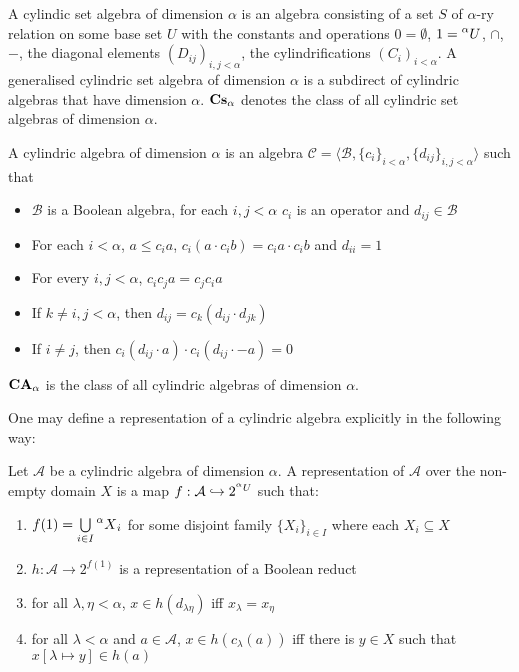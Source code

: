 \documentclass[a4paper]{article}
\theoremstyle{defin}
\theoremstyle{theorem}
\theoremstyle{claim}
\theoremstyle{prop}
\theoremstyle{lemma}
\theoremstyle{fact}
\theoremstyle{ex}
\theoremstyle{col}
\begin{document}
\begin{defin}
 A cylindic set algebra of dimension $\alpha$ is an algebra consisting of a set $S$ of $\alpha$-ry relation on some base set $U$
   with the constants and operations $0 = \emptyset$, $1 = \prescript{\alpha}{}U$, $\cap$, $-$, the diagonal elements $(D_{ij})_{i, j < \alpha}$, the cylindrifications $(C_i)_{i < \alpha}$. A generalised cylindric set algebra of dimension $\alpha$ is a subdirect of cylindric algebras that have dimension $\alpha$.
   ${\bf Cs}_{\alpha}$ denotes the class of all cylindric set algebras of dimension $\alpha$.
\end{defin}

\begin{defin}
   A cylindric algebra of dimension $\alpha$ is an algebra $\mathcal{C} = \langle \mathcal{B}, \{ c_i \}_{i < \alpha}, \{ d_{ij} \}_{i, j < \alpha} \rangle$ such that
   \begin{itemize}
     \item $\mathcal{B}$ is a Boolean algebra, for each $i, j < \alpha$ $c_i$ is an operator and $d_{ij} \in \mathcal{B}$
     \item For each $i < \alpha$, $a \leq c_i a$, $c_i (a \cdot c_i b) = c_i a \cdot c_i b$ and $d_{ii} = 1$
     \item For every $i, j < \alpha$, $c_i c_j a = c_j c_i a$
     \item If $k \neq i, j < \alpha$, then $d_{ij} = c_k (d_{ij} \cdot d_{jk})$
     \item If $i \neq j$, then $c_i (d_{ij} \cdot a) \cdot c_i (d_{ij} \cdot - a) = 0$
   \end{itemize}
   ${\bf CA}_{\alpha}$ is the class of all cylindric algebras of dimension $\alpha$.
\end{defin}

One may define a representation of a cylindric algebra explicitly in the following way:

\begin{defin}
 Let $\mathcal{A}$ be a cylindric algebra of dimension $\alpha$. A representation of $\mathcal{A}$ over the non-empty domain $X$ is a map $f : \mathcal{A} \hookrightarrow 2^{\prescript{\alpha}{}U}$ such that:
 \begin{enumerate}
   \item $f(1) = \bigcup \limits_{i \in I} \prescript{\alpha}{}X_i$ for some disjoint family $\{X_i\}_{i \in I}$ where each $X_i \subseteq X$
   \item $h : \mathcal{A} \to 2^{f(1)}$ is a representation of a Boolean reduct
   \item for all $\lambda, \eta < \alpha$, $x \in h(d_{\lambda \eta})$ iff $x_{\lambda} = x_{\eta}$
   \item for all $\lambda < \alpha$ and $a \in \mathcal{A}$, $x \in h(c_{\lambda}(a))$ iff there is $y \in X$ such that $x[\lambda \mapsto y] \in h(a)$
 \end{enumerate}
\end{defin}
\end{document}
